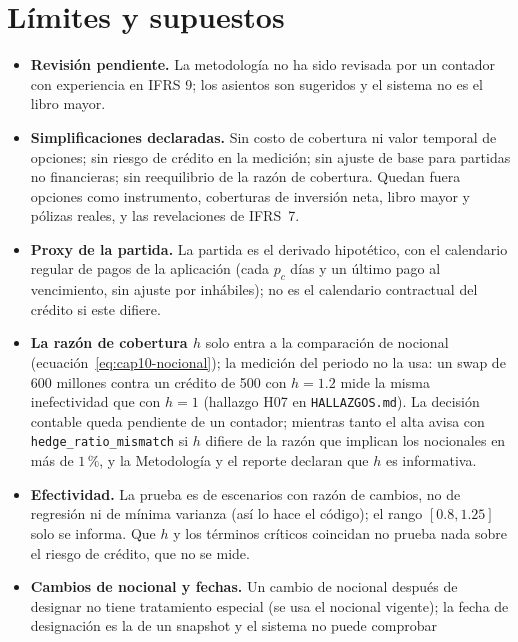 \section{Límites y supuestos}\label{sec:cap10-limites}

\begin{limites}
  \begin{itemize}
    \item \textbf{Revisión pendiente.} La metodología no ha sido revisada por un contador con experiencia en IFRS 9; los
      asientos son sugeridos y el sistema no es el libro mayor.
    \item \textbf{Simplificaciones declaradas.} Sin costo de cobertura ni valor temporal de opciones; sin riesgo de
      crédito en la medición; sin ajuste de base para partidas no financieras; sin reequilibrio de la razón de cobertura.
      Quedan fuera opciones como instrumento, coberturas de inversión neta, libro mayor y pólizas reales, y las revelaciones de IFRS~7.
    \item \textbf{Proxy de la partida.} La partida es el derivado hipotético, con el calendario regular de pagos de la
      aplicación (cada $p_c$ días y un último pago al vencimiento, sin ajuste por inhábiles); no es el calendario
      contractual del crédito si este difiere.
    \item \textbf{La razón de cobertura $h$} solo entra a la comparación de nocional
      (ecuación~\eqref{eq:cap10-nocional}); la medición del periodo no la usa: un swap de 600 millones contra un crédito de 500
      con $h=1.2$ mide la misma inefectividad que con $h=1$ (hallazgo H07 en \texttt{HALLAZGOS.md}). La decisión contable
      queda pendiente de un contador; mientras tanto el alta avisa con \texttt{hedge\_ratio\_mismatch} si $h$ difiere
      de la razón que implican los nocionales en más de $1\,\%$, y la Metodología y el reporte declaran que $h$ es
      informativa.
    \item \textbf{Efectividad.} La prueba es de escenarios con razón de cambios, no de regresión ni de mínima varianza
      (así lo hace el código); el rango $[0.8, 1.25]$ solo se informa. Que $h$ y los términos críticos coincidan no prueba nada
      sobre el riesgo de crédito, que no se mide.
    \item \textbf{Cambios de nocional y fechas.} Un cambio de nocional después de designar no tiene tratamiento
      especial (se usa el nocional vigente); la fecha de designación es la de un snapshot y el sistema no puede comprobar

\end{itemize}
\end{limites}
